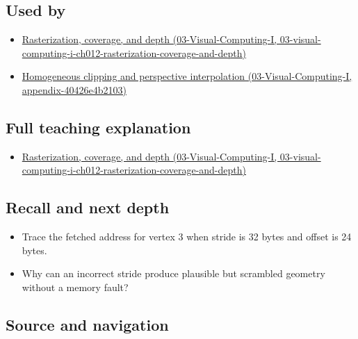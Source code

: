 \subsection{Used by}\label{appendix-749ba51a6c25-used-by}

\begin{itemize}
\tightlist
\item
  \href{../03-Visual-Computing-I/main.pdf\#nameddest=03-visual-computing-i-ch012-rasterization-coverage-and-depth}{Rasterization, coverage, and depth (03-Visual-Computing-I, 03-visual-computing-i-ch012-rasterization-coverage-and-depth)}
\item
  \href{../03-Visual-Computing-I/main.pdf\#nameddest=appendix-40426e4b2103}{Homogeneous clipping and perspective interpolation (03-Visual-Computing-I, appendix-40426e4b2103)}
\end{itemize}

\subsection{Full teaching explanation}\label{appendix-749ba51a6c25-full-teaching-explanation}

\begin{itemize}
\tightlist
\item
  \href{../03-Visual-Computing-I/main.pdf\#nameddest=03-visual-computing-i-ch012-rasterization-coverage-and-depth}{Rasterization, coverage, and depth (03-Visual-Computing-I, 03-visual-computing-i-ch012-rasterization-coverage-and-depth)}
\end{itemize}

\subsection{Recall and next depth}\label{appendix-749ba51a6c25-recall-and-next-depth}

\begin{itemize}
\tightlist
\item
  Trace the fetched address for vertex 3 when stride is 32 bytes and offset is 24 bytes.
\item
  Why can an incorrect stride produce plausible but scrambled geometry without a memory fault?
\end{itemize}

\subsection{Source and navigation}\label{appendix-749ba51a6c25-source-and-navigation}

